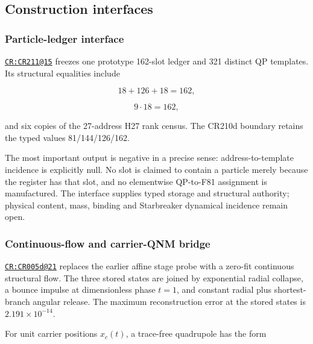\subsection{Construction interfaces}\label{viii-ch08-construction-interfaces}

\subsubsection{Particle-ledger
interface}\label{viii-ch08-particle-ledger-interface}

\href{https://github.com/iwtbotiwtwot/SAMA/blob/4c2b5dc1649da5900c90b90d0ce56c223dbb7717/tests/courtroom/15-scale-bridge-simulator-cr211-starbreaker-particle-ledger-interface/README.md}{\texttt{CR:CR211@15}}
freezes one prototype 162-slot ledger and 321 distinct QP templates. Its
structural equalities include

\[
18+126+18=162,
\]

\[
9\cdot18=162,
\]

and six copies of the 27-address H27 rank census. The CR210d boundary
retains the typed values 81/144/126/162.

The most important output is negative in a precise sense:
address-to-template incidence is explicitly null. No slot is claimed to
contain a particle merely because the register has that slot, and no
elementwise QP-to-F81 assignment is manufactured. The interface supplies
typed storage and structural authority; physical content, mass, binding
and Starbreaker dynamical incidence remain open.

\subsubsection{Continuous-flow and carrier-QNM
bridge}\label{viii-ch08-continuous-flow-and-carrier-qnm-bridge}

\href{https://github.com/iwtbotiwtwot/SAMA/blob/4c2b5dc1649da5900c90b90d0ce56c223dbb7717/tests/courtroom/21-gravitational-waves-cr005d-starbreaker-continuous-flow-and-carrier-qnm-source-bridge/README.md}{\texttt{CR:CR005d@21}}
replaces the earlier affine stage probe with a zero-fit continuous
structural flow. The three stored states are joined by exponential
radial collapse, a bounce impulse at dimensionless phase \(t=1\), and
constant radial plus shortest-branch angular release. The maximum
reconstruction error at the stored states is \(2.191\times10^{-14}\).

For unit carrier positions \(x_c(t)\), a trace-free quadrupole has the
form

